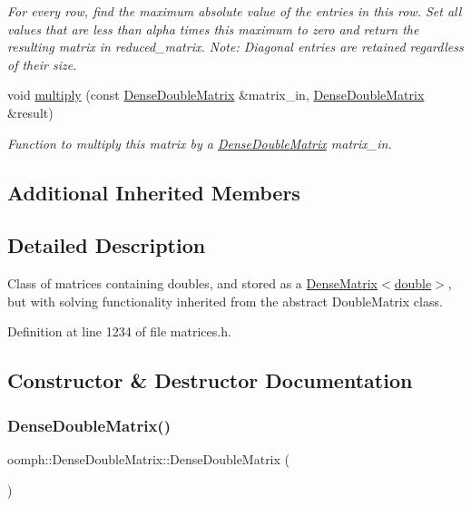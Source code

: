 \begin{DoxyCompactItemize}
\begin{DoxyCompactList}\small\item\em For every row, find the maximum absolute value of the entries in this row. Set all values that are less than alpha times this maximum to zero and return the resulting matrix in reduced\+\_\+matrix. Note\+: Diagonal entries are retained regardless of their size. \end{DoxyCompactList}\item 
void \hyperlink{classoomph_1_1DenseDoubleMatrix_aab687b1136f0265434ada2684aa1b0a4}{multiply} (const \hyperlink{classoomph_1_1DenseDoubleMatrix}{Dense\+Double\+Matrix} \&matrix\+\_\+in, \hyperlink{classoomph_1_1DenseDoubleMatrix}{Dense\+Double\+Matrix} \&result)
\begin{DoxyCompactList}\small\item\em Function to multiply this matrix by a \hyperlink{classoomph_1_1DenseDoubleMatrix}{Dense\+Double\+Matrix} matrix\+\_\+in. \end{DoxyCompactList}\end{DoxyCompactItemize}
\subsection*{Additional Inherited Members}


\subsection{Detailed Description}
Class of matrices containing doubles, and stored as a \hyperlink{classoomph_1_1DenseMatrix}{Dense\+Matrix$<$double$>$}, but with solving functionality inherited from the abstract Double\+Matrix class. 

Definition at line 1234 of file matrices.\+h.



\subsection{Constructor \& Destructor Documentation}
\mbox{\label{classoomph_1_1DenseDoubleMatrix_a3f4448fda5506f6f8080228c3f8c7e06}} 
\subsubsection{\texorpdfstring{Dense\+Double\+Matrix()}{DenseDoubleMatrix()}\hspace{0.1cm}{\footnotesize\ttfamily [1/5]}}
{\footnotesize\ttfamily oomph\+::\+Dense\+Double\+Matrix\+::\+Dense\+Double\+Matrix (\begin{DoxyParamCaption}{ }\end{DoxyParamCaption})}



